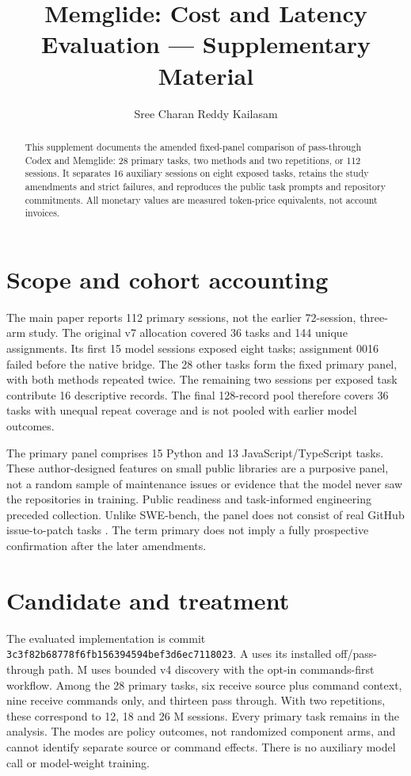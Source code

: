 \documentclass[manuscript,screen,nonacm]{acmart}
\title[Memglide: Bounded Repository Context]{Memglide: Cost and Latency
Evaluation --- Supplementary Material}
\author{Sree Charan Reddy Kailasam}
\begin{document}
\begin{abstract}
This supplement documents the amended fixed-panel comparison of
pass-through Codex and Memglide: 28 primary tasks, two methods and two
repetitions, or 112 sessions. It separates 16 auxiliary sessions on
eight exposed tasks, retains the study amendments and strict failures,
and reproduces the public task prompts and repository commitments. All
monetary values are measured token-price equivalents, not account
invoices.
\end{abstract}
\maketitle
\section{Scope and cohort accounting}\label{scope-and-cohort-accounting}

The main paper reports 112 primary sessions, not the earlier 72-session,
three-arm study. The original v7 allocation covered 36 tasks and 144
unique assignments. Its first 15 model sessions exposed eight tasks;
assignment 0016 failed before the native bridge. The 28 other tasks form
the fixed primary panel, with both methods repeated twice. The remaining
two sessions per exposed task contribute 16 descriptive records. The
final 128-record pool therefore covers 36 tasks with unequal repeat
coverage and is not pooled with earlier model outcomes.

The primary panel comprises 15 Python and 13 JavaScript/TypeScript
tasks. These author-designed features on small public libraries are a
purposive panel, not a random sample of maintenance issues or evidence
that the model never saw the repositories in training. Public readiness
and task-informed engineering preceded collection. Unlike SWE-bench, the
panel does not consist of real GitHub issue-to-patch tasks
\citep{jimenez2024swebench}. The term primary does not imply a fully
prospective confirmation after the later amendments.

\section{Candidate and treatment}\label{candidate-and-treatment}

The evaluated implementation is commit
\nolinkurl{3c3f82b68778f6fb156394594bef3d6ec7118023}. A uses its
installed off/pass-through path. M uses bounded v4 discovery with the
opt-in commands-first workflow. Among the 28 primary tasks, six receive
source plus command context, nine receive commands only, and thirteen
pass through. With two repetitions, these correspond to 12, 18 and 26 M
sessions. Every primary task remains in the analysis. The modes are
policy outcomes, not randomized component arms, and cannot identify
separate source or command effects. There is no auxiliary model call or
model-weight training.
\end{document}

